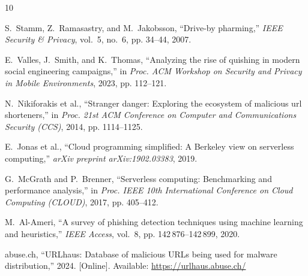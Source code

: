 \documentclass[10pt,conference,letterpaper]{IEEEtran}
\begin{document}

\begin{thebibliography}{10}

S.~Stamm, Z.~Ramasastry, and M.~Jakobsson, ``Drive-by pharming,'' \emph{IEEE Security \& Privacy}, vol.~5, no.~6, pp. 34--44, 2007.

E.~Valles, J.~Smith, and K.~Thomas, ``Analyzing the rise of quishing in modern social engineering campaigns,'' in \emph{Proc. ACM Workshop on Security and Privacy in Mobile Environments}, 2023, pp. 112--121.

N.~Nikiforakis et al., ``Stranger danger: Exploring the ecosystem of malicious url shorteners,'' in \emph{Proc. 21st ACM Conference on Computer and Communications Security (CCS)}, 2014, pp. 1114--1125.

E.~Jonas et al., ``Cloud programming simplified: A Berkeley view on serverless computing,'' \emph{arXiv preprint arXiv:1902.03383}, 2019.

G.~McGrath and P.~Brenner, ``Serverless computing: Benchmarking and performance analysis,'' in \emph{Proc. IEEE 10th International Conference on Cloud Computing (CLOUD)}, 2017, pp. 405--412.

M.~Al-Ameri, ``A survey of phishing detection techniques using machine learning and heuristics,'' \emph{IEEE Access}, vol.~8, pp. 142\,876--142\,899, 2020.

abuse.ch, ``URLhaus: Database of malicious URLs being used for malware distribution,'' 2024. [Online]. Available: \url{https://urlhaus.abuse.ch/}

\end{thebibliography}
\end{document}
